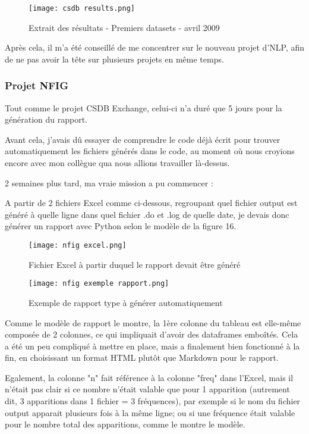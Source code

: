 \begin{figure}[H]
    \centering
    \texttt{[image: csdb results.png]}
    \caption{Extrait des résultats - Premiers datasets - avril 2009}
\end{figure}

Après cela, il m'a été conseillé de me concentrer sur le nouveau projet d'NLP, afin de ne pas avoir la tête sur plusieurs projets en même temps.

\pagebreak

\subsubsection{Projet NFIG}

Tout comme le projet CSDB Exchange, celui-ci n'a duré que 5 jours pour la génération du rapport.

Avant cela, j'avais dû essayer de comprendre le code déjà écrit pour trouver automatiquement les fichiers générés dans le code, au moment où nous croyions encore avec mon collègue qua nous allions travailler là-dessus.

2 semaines plus tard, ma vraie mission a pu commencer : 

A partir de 2 fichiers Excel comme ci-dessous, regroupant quel fichier output est généré à quelle ligne dans quel fichier .do et .log de quelle date, je devais donc générer un rapport avec Python selon le modèle de la figure 16.

\begin{figure}[H]
    \centering
    \texttt{[image: nfig excel.png]}
    \caption{Fichier Excel à partir duquel le rapport devait être généré}
\end{figure}

\begin{figure}[H]
    \centering
    \texttt{[image: nfig exemple rapport.png]}
    \caption{Exemple de rapport type à générer automatiquement}
\end{figure}

Comme le modèle de rapport le montre, la 1ère colonne du tableau est elle-même composée de 2 colonnes, ce qui impliquait d'avoir des dataframes emboîtés.
Cela a été un peu compliqué à mettre en place, mais a finalement bien fonctionné à la fin, en choisissant un format HTML plutôt que Markdown pour le rapport.

Egalement, la colonne "n" fait référence à la colonne "freq" dans l'Excel, mais il n'était pas clair si ce nombre n'était valable que pour 1 apparition (autrement dit, 3 apparitions dans 1 fichier = 3 fréquences), par exemple si le nom du fichier output apparait plusieurs fois à la même ligne; 
ou si une fréquence était valable pour le nombre total des apparitions, comme le montre le modèle.

